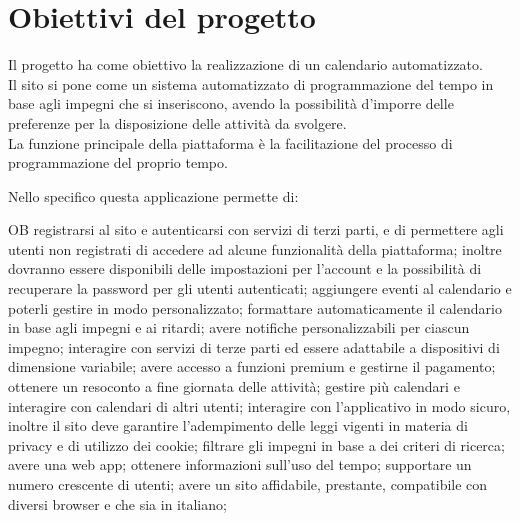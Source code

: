\section{Obiettivi del progetto}
\label{sec:ObiettiviProgetto}
Il progetto ha come obiettivo la realizzazione di un calendario automatizzato.\\
Il sito si pone come un sistema automatizzato di programmazione del tempo in base agli impegni che si inseriscono, avendo la possibilità d'imporre delle preferenze per la disposizione delle attività da svolgere.\\
La funzione principale della piattaforma è la facilitazione del processo di programmazione del proprio tempo.

\vspace{0.5cm}

Nello specifico questa applicazione permette di:
\begin{listaPersonale}{OB}
       registrarsi al sito e autenticarsi con servizi di terzi parti, e di permettere agli utenti non registrati di accedere ad alcune funzionalità della piattaforma; inoltre dovranno essere disponibili delle impostazioni per l'account e la possibilità di recuperare la password per gli utenti autenticati;
       aggiungere eventi al calendario e poterli gestire in modo personalizzato;
       formattare automaticamente il calendario in base agli impegni e ai ritardi;
       avere notifiche personalizzabili per ciascun impegno;
       interagire con servizi di terze parti ed essere adattabile a dispositivi di dimensione variabile;
       avere accesso a funzioni premium e gestirne il pagamento;
       ottenere un resoconto a fine giornata delle attività;
       gestire più calendari e interagire con calendari di altri utenti;
       interagire con l'applicativo in modo sicuro, inoltre il sito deve garantire l'adempimento delle leggi vigenti in materia di privacy e di utilizzo dei cookie;
       filtrare gli impegni in base a dei criteri di ricerca;
       avere una web app;
       ottenere informazioni sull'uso del tempo;
       supportare un numero crescente di utenti;
       avere un sito affidabile, prestante, compatibile con diversi browser e che sia in italiano;
\end{listaPersonale}
